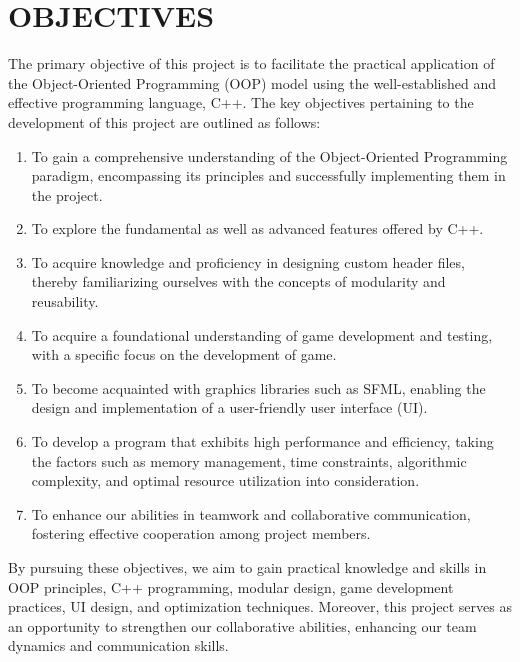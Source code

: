 \newpage

\section{OBJECTIVES}
The primary objective of this project is to facilitate the practical application of the Object-Oriented Programming (OOP) model using the well-established and effective programming language, C++. The key objectives pertaining to the development of this project are outlined as follows:

\begin{enumerate}
	\item To gain a comprehensive understanding of the Object-Oriented Programming paradigm, encompassing its principles and successfully implementing them in the project.
	\item To explore the fundamental as well as advanced features offered by C++.
	\item To acquire knowledge and proficiency in designing custom header files, thereby familiarizing ourselves with the concepts of modularity and reusability.
	\item To acquire a foundational understanding of game development and testing, with a specific focus on the development of game.
	\item To become acquainted with graphics libraries such as SFML, enabling the design and implementation of a user-friendly user interface (UI).
	\item To develop a program that exhibits high performance and efficiency, taking the factors such as memory management, time constraints, algorithmic complexity, and optimal resource utilization into consideration. 
	\item To enhance our abilities in teamwork and collaborative communication, fostering effective cooperation among project members.
	
\end{enumerate}

By pursuing these objectives, we aim to gain practical knowledge and skills in OOP principles, C++ programming, modular design, game development practices, UI design, and optimization techniques. Moreover, this project serves as an opportunity to strengthen our collaborative abilities, enhancing our team dynamics and communication skills.

\newpage